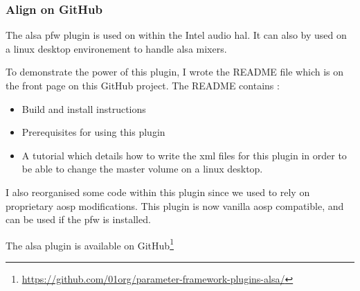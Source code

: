 \subsubsection{Align on GitHub}
The \gls{alsa} \gls{pfw} plugin is used on within the Intel audio \gls{hal}. It can also by used
on a linux desktop environement to handle \gls{alsa} mixers.

To demonstrate the power of this plugin, I wrote the README file which is on the
front page on this \gls{GitHub} project.  The README contains :
\begin{itemize}
    \item Build and install instructions
    \item Prerequisites for using this plugin
    \item A tutorial which details how to write the \gls{xml} files for this
    plugin in order to be able to change the master volume on a linux desktop.
\end{itemize}
I also reorganised some code within this plugin since we used to rely on proprietary \gls{aosp} modifications.
This plugin is now \gls{vanilla} \gls{aosp} compatible, and can be used if the \gls{pfw} is installed.

The \gls{alsa} plugin is available on \gls{GitHub}\footnote{\url{https://github.com/01org/parameter-framework-plugins-alsa/}}
